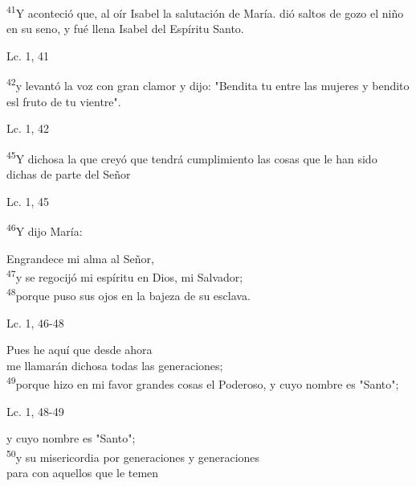 \documentclass[a4paper,11pt,sans]{article}
\begin{document}
      \textsuperscript{41}Y aconteció que, al oír Isabel la salutación de María. dió saltos de gozo el niño en su seno, y fué llena Isabel del Espíritu Santo.
      \begin{center}
        Lc. 1, 41        
      \end{center}
      
      \textsuperscript{42}y levantó la voz con gran clamor y dijo: "Bendita tu entre las mujeres y bendito esl fruto de tu vientre".

      \begin{center}
        Lc. 1, 42         
      \end{center}
      
      \textsuperscript{45}Y dichosa la que creyó que tendrá cumplimiento las cosas que le han sido dichas de parte del Señor
      \begin{center}
        Lc. 1, 45         
      \end{center}
      
      \textsuperscript{46}Y dijo María:
      \begin{center}
        Engrandece mi alma al Señor, \\
        \textsuperscript{47}y se regocijó mi espíritu en Dios, mi Salvador; \\
        \textsuperscript{48}porque puso sus ojos en la bajeza de su esclava.
      \end{center}

      \begin{center}
        Lc. 1, 46-48        
      \end{center}

      \begin{center}
        Pues he aquí que desde ahora \\
        me llamarán dichosa todas las generaciones;\\
        \textsuperscript{49}porque hizo en mi favor grandes cosas el Poderoso,
        y cuyo nombre es "Santo";
      \end{center}

      \begin{center}
        Lc. 1, 48-49          
      \end{center}
      
      \begin{center}
        y cuyo nombre es "Santo"; \\
        \textsuperscript{50}y su misericordia por generaciones y generaciones \\
        para con aquellos que le temen
      \end{center}
\end{document}
